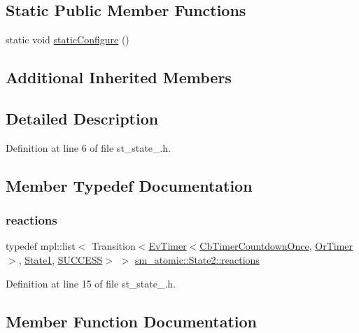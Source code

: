 \subsection*{Static Public Member Functions}
\begin{DoxyCompactItemize}
\item 
static void \hyperlink{structsm__atomic_1_1State2_ab6cafa3e8433c2d7ee10fa6fec8f3748}{static\+Configure} ()
\end{DoxyCompactItemize}
\subsection*{Additional Inherited Members}


\subsection{Detailed Description}


Definition at line 6 of file st\+\_\+state\+\_.\+h.



\subsection{Member Typedef Documentation}
\mbox{\label{structsm__atomic_1_1State2_a9436556de6be8ea64fd35707aa4bfec8}} 
\subsubsection{\texorpdfstring{reactions}{reactions}}
{\footnotesize\ttfamily typedef mpl\+::list$<$ Transition$<$\hyperlink{structcl__ros__timer_1_1EvTimer}{Ev\+Timer}$<$\hyperlink{classcl__ros__timer_1_1CbTimerCountdownOnce}{Cb\+Timer\+Countdown\+Once}, \hyperlink{classsm__atomic_1_1OrTimer}{Or\+Timer}$>$, \hyperlink{structsm__atomic_1_1State1}{State1}, \hyperlink{structsmacc_1_1default__transition__tags_1_1SUCCESS}{S\+U\+C\+C\+E\+SS}$>$ $>$ \hyperlink{structsm__atomic_1_1State2_a9436556de6be8ea64fd35707aa4bfec8}{sm\+\_\+atomic\+::\+State2\+::reactions}}



Definition at line 15 of file st\+\_\+state\+\_.\+h.



\subsection{Member Function Documentation}
\mbox{\label{structsm__atomic_1_1State2_a85ae934666acb451cd847c7192be72fc}} 
